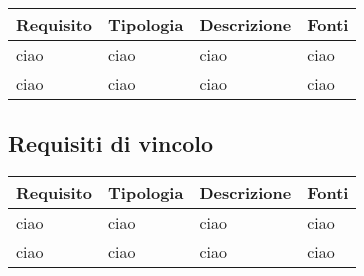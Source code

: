 			\begin{table}[h]
			\begin{longtabu}{ p{1.5cm} | p{2cm} | p{5cm} | p{2cm}}
		
			 \textbf{Requisito} &  \textbf{Tipologia} 
			&  \textbf{Descrizione} &  \textbf{Fonti} \\ \hline
			
				ciao & ciao & ciao & ciao\\ \hline
				ciao & ciao & ciao & ciao \\ \hline
  
  			\end{longtabu}
			\end{table}  
			
\subsection{Requisiti di vincolo }

			\begin{table}[h]
			\begin{longtabu}{ p{1.5cm} | p{2cm} | p{5cm} | p{2cm}}
		
			 \textbf{Requisito} &  \textbf{Tipologia} 
			&  \textbf{Descrizione} &  \textbf{Fonti} \\ \hline
			
				ciao & ciao & ciao & ciao\\ \hline
				ciao & ciao & ciao & ciao \\ \hline
  
  			\end{longtabu}
			\end{table}  